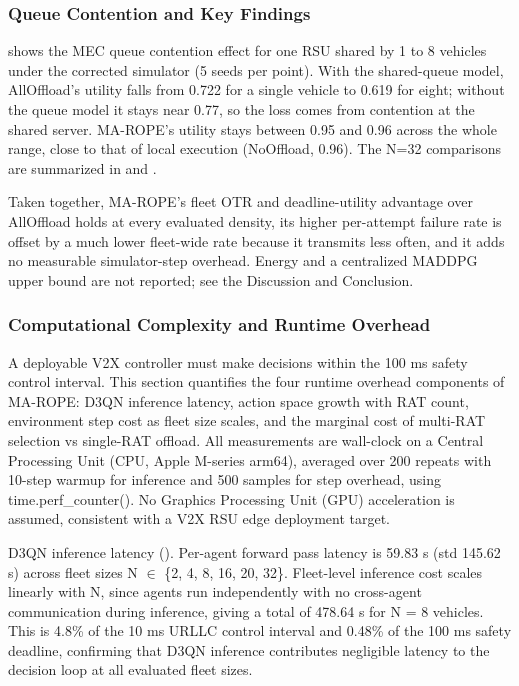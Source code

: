 \subsubsection{Queue Contention and Key Findings}

 shows the MEC queue contention effect for one RSU shared by 1 to 8 vehicles under the corrected simulator (5 seeds per point). With the shared-queue model, AllOffload's utility falls from 0.722 for a single vehicle to 0.619 for eight; without the queue model it stays near 0.77, so the loss comes from contention at the shared server. MA-ROPE's utility stays between 0.95 and 0.96 across the whole range, close to that of local execution (NoOffload, 0.96). The N=32 comparisons are summarized in  and .









Taken together, MA-ROPE's fleet OTR and deadline-utility advantage over AllOffload holds at every evaluated density, its higher per-attempt failure rate is offset by a much lower fleet-wide rate because it transmits less often, and it adds no measurable simulator-step overhead. Energy and a centralized MADDPG upper bound are not reported; see the Discussion and Conclusion.

\subsubsection{Computational Complexity and Runtime Overhead}

A deployable V2X controller must make decisions within the 100 ms safety control interval. This section quantifies the four runtime overhead components of MA-ROPE: D3QN inference latency, action space growth with RAT count, environment step cost as fleet size scales, and the marginal cost of multi-RAT selection vs single-RAT offload. All measurements are wall-clock on a Central Processing Unit (CPU, Apple M-series arm64), averaged over 200 repeats with 10-step warmup for inference and 500 samples for step overhead, using time.perf\_counter(). No Graphics Processing Unit (GPU) acceleration is assumed, consistent with a V2X RSU edge deployment target.

D3QN inference latency (). Per-agent forward pass latency is 59.83 \textmu s (std 145.62 \textmu s) across fleet sizes N $\in$ \{2, 4, 8, 16, 20, 32\}. Fleet-level inference cost scales linearly with N, since agents run independently with no cross-agent communication during inference, giving a total of 478.64 \textmu s for N = 8 vehicles. This is 4.8\% of the 10 ms URLLC control interval and 0.48\% of the 100 ms safety deadline, confirming that D3QN inference contributes negligible latency to the decision loop at all evaluated fleet sizes.

